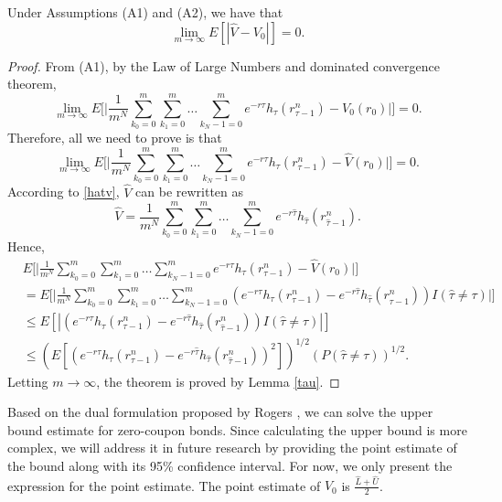 \documentclass[reqno]{amsart}
\begin{document}
\begin{theorem}
 Under Assumptions {\rm (A1)} and {\rm (A2)}, we have that
\[
 \lim _{m \to \infty} E\left[\left|\hat{V}-V_0\right|\right]=0 .
\]
\end{theorem}

\begin{proof}
From (A1), by the Law of Large Numbers and dominated convergence theorem,
\[
 \lim _{m \to \infty} E\Big[\Big| \frac{1}{m^N} 
 \sum_{k_0=0}^m \sum_{k_1=0}^m \dots \sum_{k_N-1=0}^m 
 e^{-r \tau} h_{\tau}\left(r_{\tau-1}^n\right) - V_0\left(r_0 \right) \Big|\Big]=0 .
\]
Therefore, all we need to prove is that
\[
 \lim _{m \to \infty} E\Big[\Big| \frac{1}{m^N} \sum_{k_0=0}^m \sum_{k_1=0}^m 
 \dots \sum_{k_N-1=0}^m e^{-r \tau} h_{\tau}\left(r_{\tau-1}^n\right) 
 - \hat{V}\left(r_0 \right) \Big|\Big]=0 .
\]
According to \eqref{hatv}, $\hat{V}$ can be rewritten as
\[
 \hat{V}=\frac{1}{m^N} \sum_{k_0=0}^m \sum_{k_1=0}^m \dots 
 \sum_{k_N-1=0}^m e^{-r \hat{\tau}} h_{\hat{\tau}}\left(r_{\hat{\tau}-1}^n\right).
\]
Hence,
\begin{align*}
& E\Big[\Big| \frac{1}{m^N} \sum_{k_0=0}^m \sum_{k_1=0}^m \dots 
 \sum_{k_N-1=0}^m e^{-r \tau} h_{\tau}\left(r_{\tau-1}^n\right) 
 - \hat{V}\left(r_0 \right)\Big|\Big] \\
&= E\Big[\Big| \frac{1}{m^N} \sum_{k_0=0}^m \sum_{k_1=0}^m \dots 
 \sum_{k_N-1=0}^m \left(e^{-r \tau} h_{\tau}\left(r_{\tau-1}^n\right)
  -e^{-r \hat{\tau}} h_{\hat{\tau}}\left(r_{\hat{\tau}-1}^n\right)\right) 
  I\left(\hat{\tau} \neq \tau\right)\Big|\Big] \\
&\leq  E\left[\left|\left(e^{-r \tau} h_{\tau}\left(r_{\tau-1}^n\right)
 -e^{-r \hat{\tau}} h_{\hat{\tau}}\left(r_{\hat{\tau}-1}^n\right)\right) 
  I\left(\hat{\tau} \neq \tau\right)\right|\right] \\
&\leq \left(E\left[\left(e^{-r \tau} h_{\tau}\left(r_{\tau-1}^n\right)
 -e^{-r \hat{\tau}} h_{\hat{\tau}}\left(r_{\hat{\tau}-1}^n\right)
  \right)^2\right]\right)^{1 / 2}\left(P\left(\hat{\tau} 
  \neq \tau\right)\right)^{1 / 2} .
\end{align*}
Letting $m \to \infty$, the theorem is proved by Lemma \ref{tau}.
\end{proof}

\begin{remark} \rm
Based on the dual formulation proposed by Rogers \cite{rogers2002monte}, we can 
solve the upper bound estimate for zero-coupon bonds.
Since calculating the upper bound is more complex, we will address it in future 
research by providing the point estimate of the bound along with its 95\% confidence 
interval. For now, we only present the expression for the point estimate.
 The point estimate of $V_0$ is
$ \frac{\hat{L}+\hat{U}}{2}$.
\end{remark}
\end{document}
